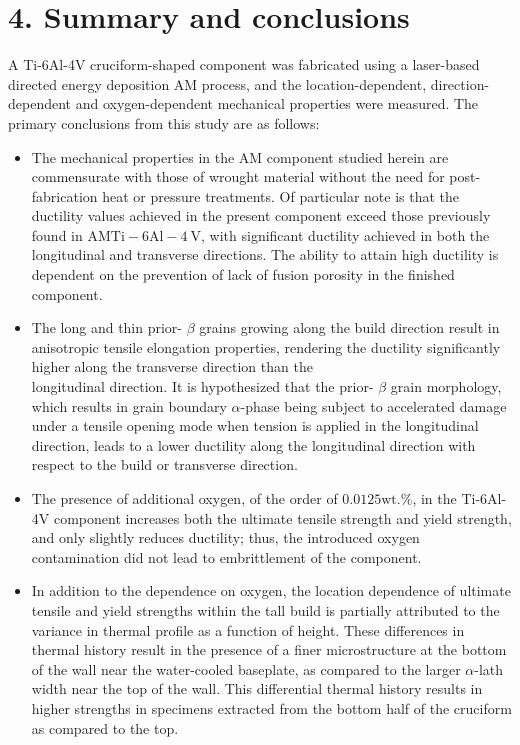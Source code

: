 \documentclass[10pt]{article}
\begin{document}
\section*{4. Summary and conclusions}
A Ti-6Al-4V cruciform-shaped component was fabricated using a laser-based directed energy deposition AM process, and the location-dependent, direction-dependent and oxygen-dependent mechanical properties were measured. The primary conclusions from this study are as follows:

\begin{itemize}
  \item The mechanical properties in the AM component studied herein are commensurate with those of wrought material without the need for post-fabrication heat or pressure treatments. Of particular note is that the ductility values achieved in the present component exceed those previously found in $\mathrm{AM} \mathrm{Ti}-6 \mathrm{Al}-4 \mathrm{~V}$, with significant ductility achieved in both the longitudinal and transverse directions. The ability to attain high ductility is dependent on the prevention of lack of fusion porosity in the finished component.
  \item The long and thin prior- $\beta$ grains growing along the build direction result in anisotropic tensile elongation properties, rendering the ductility significantly higher along the transverse direction than the\\
longitudinal direction. It is hypothesized that the prior- $\beta$ grain morphology, which results in grain boundary $\alpha$-phase being subject to accelerated damage under a tensile opening mode when tension is applied in the longitudinal direction, leads to a lower ductility along the longitudinal direction with respect to the build or transverse direction.
  \item The presence of additional oxygen, of the order of $0.0125 \mathrm{wt} . \%$, in the Ti-6Al-4V component increases both the ultimate tensile strength and yield strength, and only slightly reduces ductility; thus, the introduced oxygen contamination did not lead to embrittlement of the component.
  \item In addition to the dependence on oxygen, the location dependence of ultimate tensile and yield strengths within the tall build is partially attributed to the variance in thermal profile as a function of height. These differences in thermal history result in the presence of a finer microstructure at the bottom of the wall near the water-cooled baseplate, as compared to the larger $\alpha$-lath width near the top of the wall. This differential thermal history results in higher strengths in specimens extracted from the bottom half of the cruciform as compared to the top.
\end{itemize}
\end{document}

